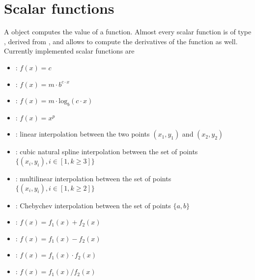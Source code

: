 %
%
%
%
%
% 
%
%

\section{Scalar functions}\label{sec:ScalarFunction}
A  object computes the value of a function.
Almost every scalar function is of type ,
derived from , and allows to compute the derivatives of
the function as well. Currently implemented scalar functions are
\begin{itemize}
\item {}: $f(x)=c$
\item {}: $f(x)=m\cdot b^{c\cdot{x}}$
\item {}: $f(x)=m\cdot\textrm{log}_b(c\cdot{x})$
\item {}: $f(x)=x^p$
\item {}: linear interpolation between the two points $(x_1,y_1)$
and $(x_2,y_2)$
\item {}: cubic natural spline interpolation between the 
set of points $\{(x_i,y_i), i\in[1,k\geq3]\}$
\item {}: multilinear interpolation between the 
set of points $\{(x_i,y_i), i\in[1,k\geq2]\}$
\item {}: Chebychev interpolation between the 
set of points $\{a,b\}$
\item {}: $f(x)=f_1(x) + f_2(x)$
\item {}: $f(x)=f_1(x) - f_2(x)$
\item {}: $f(x)=f_1(x) \cdot f_2(x)$
\item {}: $f(x)=f_1(x) / f_2(x)$
\end{itemize}

